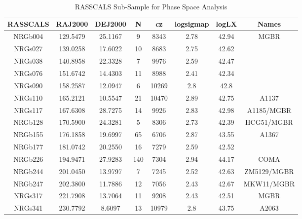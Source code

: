 \begin{table}
\caption{RASSCALS Sub-Sample for Phase Space Analysis}
\begin{tabular}{cccccccc}
\hline \hline
RASSCALS & RAJ2000 & DEJ2000 & N & cz & logsigmap & logLX & Names \\
\hline
NRGb004 & 129.5479 & 25.1167 & 9 & 8343 & 2.78 & 42.94 & MGBR \\
NRGs027 & 139.0258 & 17.6022 & 10 & 8683 & 2.75 & 42.62 &  \\
NRGs038 & 140.8958 & 22.3328 & 7 & 9976 & 2.59 & 42.47 &  \\
NRGs076 & 151.6742 & 14.4303 & 11 & 8988 & 2.41 & 42.34 &  \\
NRGs090 & 158.2587 & 12.0947 & 6 & 10269 & 2.8 & 42.8 &  \\
NRGs110 & 165.2121 & 10.5547 & 21 & 10470 & 2.89 & 42.75 & A1137 \\
NRGs117 & 167.6308 & 28.7275 & 14 & 9926 & 2.83 & 42.98 & A1185/MGBR \\
NRGb128 & 170.5900 & 24.3281 & 5 & 8306 & 2.73 & 42.39 & HCG51/MGBR \\
NRGb155 & 176.1858 & 19.6997 & 65 & 6706 & 2.87 & 43.55 & A1367 \\
NRGb177 & 181.0742 & 20.2550 & 16 & 7279 & 2.59 & 42.52 &  \\
NRGb226 & 194.9471 & 27.9283 & 140 & 7304 & 2.94 & 44.17 & COMA \\
NRGb244 & 201.0450 & 13.9797 & 7 & 7245 & 2.52 & 42.63 & ZM5129/MGBR \\
NRGb247 & 202.3800 & 11.7886 & 12 & 7056 & 2.43 & 42.67 & MKW11/MGBR \\
NRGs317 & 221.7908 & 13.7064 & 11 & 9208 & 2.43 & 42.51 & MGBR \\
NRGs341 & 230.7792 & 8.6097 & 13 & 10979 & 2.8 & 43.75 & A2063 \\
\hline
\end{tabular}
\end{table}
